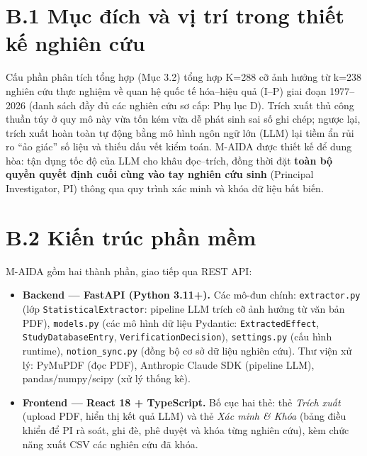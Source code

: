 \documentclass[
  a4paper,
  13pt]{extreport}
\providecommand{\tightlist}{%
  \setlength{\itemsep}{0pt}\setlength{\parskip}{0pt}}
\begin{document}
\hypertarget{b.1-mux1ee5c-ux111uxedch-vuxe0-vux1ecb-truxed-trong-thiux1ebft-kux1ebf-nghiuxean-cux1ee9u}{%
\section{B.1 Mục đích và vị trí trong thiết kế nghiên
cứu}\label{b.1-mux1ee5c-ux111uxedch-vuxe0-vux1ecb-truxed-trong-thiux1ebft-kux1ebf-nghiuxean-cux1ee9u}}

Cấu phần phân tích tổng hợp (Mục 3.2) tổng hợp K=288 cỡ ảnh hưởng từ
k=238 nghiên cứu thực nghiệm về quan hệ quốc tế hóa--hiệu quả (I--P)
giai đoạn 1977--2026 (danh sách đầy đủ các nghiên cứu sơ cấp: Phụ lục
D). Trích xuất thủ công thuần túy ở quy mô này vừa tốn kém vừa dễ phát
sinh sai số ghi chép; ngược lại, trích xuất hoàn toàn tự động bằng mô
hình ngôn ngữ lớn (LLM) lại tiềm ẩn rủi ro ``ảo giác'' số liệu và thiếu
dấu vết kiểm toán. M-AIDA được thiết kế để dung hòa: tận dụng tốc độ của
LLM cho khâu đọc--trích, đồng thời đặt \textbf{toàn bộ quyền quyết định
cuối cùng vào tay nghiên cứu sinh} (Principal Investigator, PI) thông
qua quy trình xác minh và khóa dữ liệu bất biến.

\hypertarget{b.2-kiux1ebfn-truxfac-phux1ea7n-mux1ec1m}{%
\section{B.2 Kiến trúc phần
mềm}\label{b.2-kiux1ebfn-truxfac-phux1ea7n-mux1ec1m}}

M-AIDA gồm hai thành phần, giao tiếp qua REST API:

\begin{itemize}
\tightlist
\item
  \textbf{Backend --- FastAPI (Python 3.11+).} Các mô-đun chính:
  \texttt{extractor.py} (lớp \texttt{StatisticalExtractor}: pipeline LLM
  trích cỡ ảnh hưởng từ văn bản PDF), \texttt{models.py} (các mô hình dữ
  liệu Pydantic: \texttt{ExtractedEffect}, \texttt{StudyDatabaseEntry},
  \texttt{VerificationDecision}), \texttt{settings.py} (cấu hình
  runtime), \texttt{notion\_sync.py} (đồng bộ cơ sở dữ liệu nghiên cứu).
  Thư viện xử lý: PyMuPDF (đọc PDF), Anthropic Claude SDK (pipeline
  LLM), pandas/numpy/scipy (xử lý thống kê).
\item
  \textbf{Frontend --- React 18 + TypeScript.} Bố cục hai thẻ: thẻ
  \emph{Trích xuất} (upload PDF, hiển thị kết quả LLM) và thẻ \emph{Xác
  minh \& Khóa} (bảng điều khiển để PI rà soát, ghi đè, phê duyệt và
  khóa từng nghiên cứu), kèm chức năng xuất CSV các nghiên cứu đã khóa.
\end{itemize}
\end{document}
